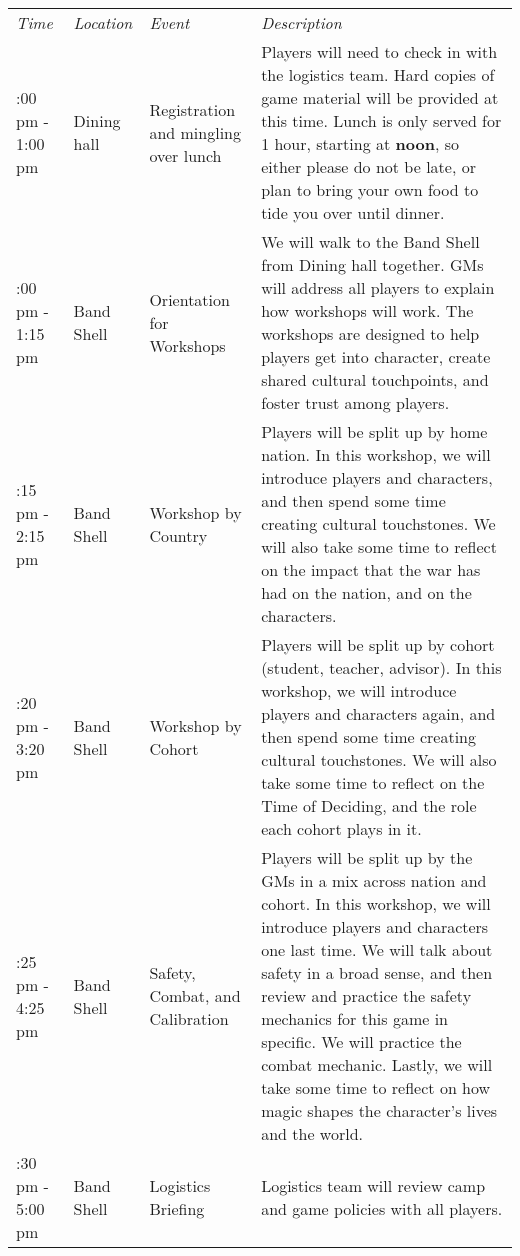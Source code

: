 \documentclass[green]{GL2020}
\begin{document}
\begin{tabularx}{\textwidth}{|>{\centering\arraybackslash} m{1.5cm} | >{\centering\arraybackslash} m{1.5cm} | >{\centering\arraybackslash} m{1.8cm} | >{\centering\arraybackslash}X |}
 \hline
\multicolumn{4}{|c|}{\textbf{Friday (Pre-Game Activities) 12:00 pm}} \\
\hline 
 \emph{Time} & \emph{Location} & \emph{Event} & \emph{Description}\\
\hline
 12:00 pm - 1:00 pm   & Dining hall & Registration and mingling over lunch &  Players will need to check in with the logistics team. Hard copies of game material will be provided at this time. Lunch is only served for 1 hour, starting at \textbf{noon}, so either please do not be late, or plan to bring your own food to tide you over until dinner. \\
    \hline
  1:00 pm - 1:15 pm  & Band Shell  & Orientation for Workshops & We will walk to the Band Shell from Dining hall together. GMs will address all players to explain how workshops will work. The workshops are designed to help players get into character, create shared cultural touchpoints, and foster trust among players. \\
    \hline
  1:15 pm - 2:15 pm & Band Shell & Workshop by Country & Players will be split up by home nation. In this workshop, we will introduce players and characters, and then spend some time creating cultural touchstones. We will also take some time to reflect on the impact that the war has had on the nation, and on the characters.  \\
    \hline
  2:20 pm - 3:20 pm & Band Shell  & Workshop by Cohort & Players will be split up by cohort (student, teacher, advisor). In this workshop, we will introduce players and characters again, and then spend some time creating cultural touchstones. We will also take some time to reflect on the Time of Deciding, and the role each cohort plays in it. \\
 \hline
  3:25 pm - 4:25 pm & Band Shell  & Safety, Combat, and Calibration & Players will be split up by the GMs in a mix across nation and cohort. In this workshop, we will introduce players and characters one last time. We will talk about safety in a broad sense, and then review and practice the safety mechanics for this game in specific. We will practice the combat mechanic. Lastly, we will take some time to reflect on how magic shapes the character’s lives and the world. \\
 \hline
  4:30 pm - 5:00 pm & Band Shell  & Logistics Briefing & Logistics team will review camp and game policies with all players. \\

\end{tabularx}
\end{document}
